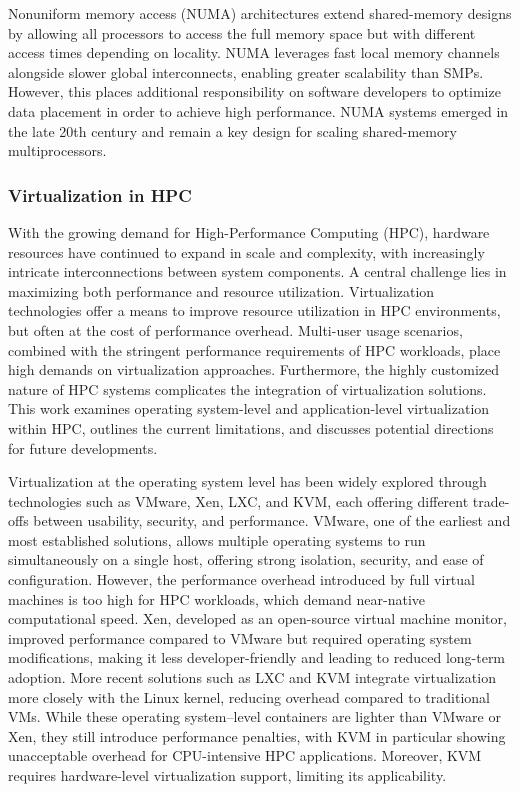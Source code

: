 Nonuniform memory access (NUMA) architectures extend shared-memory designs by allowing all processors to access the full memory space but with different access times depending on locality. NUMA leverages fast local memory channels alongside slower global interconnects, enabling greater scalability than SMPs. However, this places additional responsibility on software developers to optimize data placement in order to achieve high performance. NUMA systems emerged in the late 20th century and remain a key design for scaling shared-memory multiprocessors.


\subsubsection{Virtualization in HPC}
\label{sec:background_hpc_virtualization}
With the growing demand for High-Performance Computing (HPC), hardware resources have continued to expand in scale and complexity, with increasingly intricate interconnections between system components. A central challenge lies in maximizing both performance and resource utilization. Virtualization technologies offer a means to improve resource utilization in HPC environments, but often at the cost of performance overhead. Multi-user usage scenarios, combined with the stringent performance requirements of HPC workloads, place high demands on virtualization approaches. Furthermore, the highly customized nature of HPC systems complicates the integration of virtualization solutions. This work examines operating system-level and application-level virtualization within HPC, outlines the current limitations, and discusses potential directions for future developments.

Virtualization at the operating system level has been widely explored through technologies such as VMware, Xen, LXC, and KVM, each offering different trade-offs between usability, security, and performance. VMware, one of the earliest and most established solutions, allows multiple operating systems to run simultaneously on a single host, offering strong isolation, security, and ease of configuration. However, the performance overhead introduced by full virtual machines is too high for HPC workloads, which demand near-native computational speed. Xen, developed as an open-source virtual machine monitor, improved performance compared to VMware but required operating system modifications, making it less developer-friendly and leading to reduced long-term adoption. More recent solutions such as LXC and KVM integrate virtualization more closely with the Linux kernel, reducing overhead compared to traditional VMs. While these operating system–level containers are lighter than VMware or Xen, they still introduce performance penalties, with KVM in particular showing unacceptable overhead for CPU-intensive HPC applications. Moreover, KVM requires hardware-level virtualization support, limiting its applicability.

